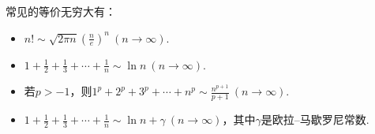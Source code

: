 常见的等价无穷大有：
\begin{itemize}
	\item \(n! \sim \sqrt{2 \pi n} \left( \frac{n}{e} \right)^n\ (n\to\infty)\).
	\item \(1+\frac12+\frac13+\dotsb+\frac1n \sim \ln n\ (n\to\infty)\).
	\item 若\(p>-1\)，则\(1^p+2^p+3^p+\dotsb+n^p \sim \frac{n^{p+1}}{p+1}\ (n\to\infty)\).%
	\item \(1+\frac12+\frac13+\dotsb+\frac1n \sim \ln n + \gamma\ (n\to\infty)\)，其中\(\gamma\)是欧拉--马歇罗尼常数.%
\end{itemize}

